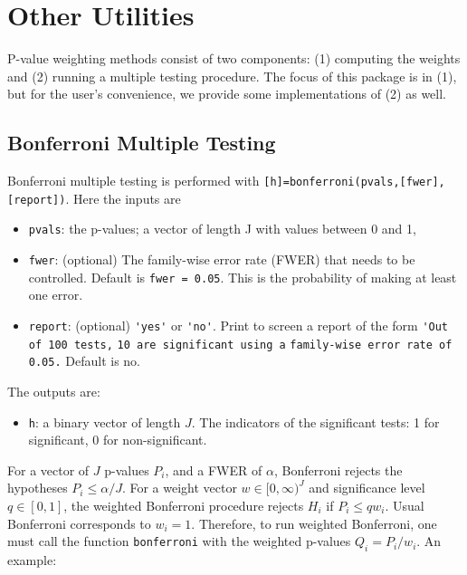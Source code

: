 \documentclass[english,11pt]{article} %
\begin{document}

\section{Other Utilities}
\label{methods_plus}

P-value weighting methods consist of two components: (1) computing the weights and (2) running a multiple testing procedure. The focus of this package is in (1), but for the user's convenience, we provide some implementations of (2) as well.

\subsection{Bonferroni Multiple Testing}


Bonferroni multiple testing is performed with \verb+[h]=bonferroni(pvals,[fwer],[report])+. Here the inputs are 

\begin{itemize}
\item \verb+pvals+:  the p-values; a vector of length J with values between 0 and 1, 
\item \verb+fwer+: (optional) The family-wise error rate (FWER) that needs to be controlled. Default is \verb+fwer = 0.05+. This is the probability of making at least one error.  
\item \verb+report+: (optional) \verb+'yes'+ or \verb+'no'+. Print to screen a report of the form \verb+'Out of 100 tests,+  \verb+10 are significant using a+  \verb+family-wise error rate of 0.05.+ Default is no.
\end{itemize}

The outputs are: 
\begin{itemize}
\item \verb+h+:  a binary vector of length $J$. The indicators of the significant tests: 1 for significant, 0 for non-significant.
\end{itemize}

For a vector of $J$ p-values $P_i$, and a FWER of $\alpha$, Bonferroni rejects the hypotheses $P_i \le \alpha/J$. For a weight vector $w \in [0,\infty)^{J}$ and significance level $q \in [0,1]$, the weighted Bonferroni procedure rejects $H_{i}$ if $P_i \le q w_i$. Usual Bonferroni corresponds to $w_i=1$. Therefore, to run weighted Bonferroni, one must call the function \verb+bonferroni+ with the weighted p-values $Q_i = P_i/w_i$. An example:
\end{document}
